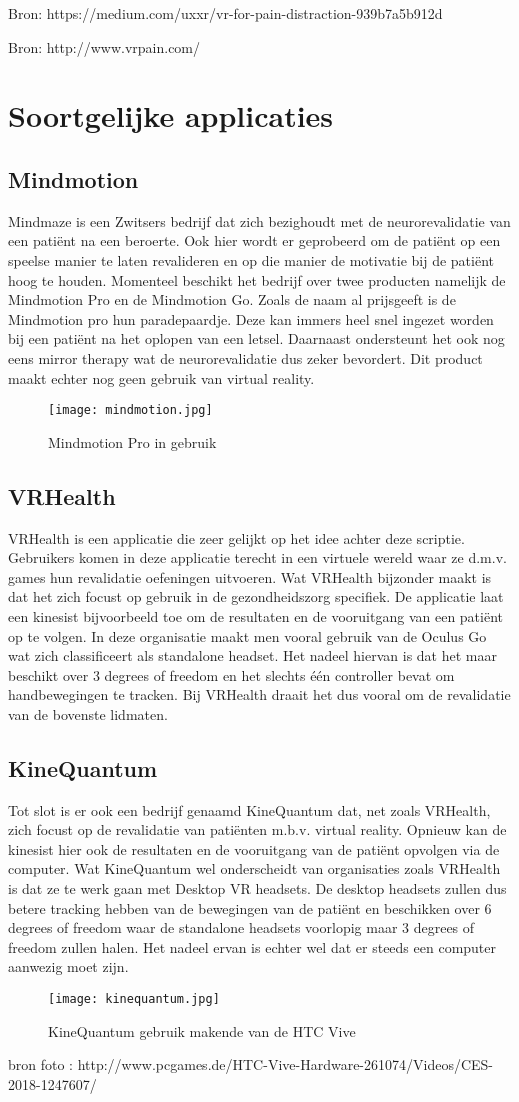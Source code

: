 Bron: https://medium.com/uxxr/vr-for-pain-distraction-939b7a5b912d

Bron: http://www.vrpain.com/


\section{Soortgelijke applicaties}
\subsection{Mindmotion}
Mindmaze is een Zwitsers bedrijf dat zich bezighoudt met de neurorevalidatie van een patiënt na een beroerte. Ook hier wordt er geprobeerd om de patiënt op een speelse manier te laten revalideren en op die manier de motivatie bij de patiënt hoog te houden. Momenteel beschikt het bedrijf over twee producten namelijk de Mindmotion Pro en de Mindmotion Go. Zoals de naam al prijsgeeft is de Mindmotion pro hun paradepaardje. Deze kan immers heel snel ingezet worden bij een patiënt na het oplopen van een letsel. Daarnaast ondersteunt het ook nog eens mirror therapy wat de neurorevalidatie dus zeker bevordert. Dit product maakt echter nog geen gebruik van virtual reality.

\begin{figure}[h]
    \centering
    \texttt{[image: mindmotion.jpg]}
    \caption{Mindmotion Pro in gebruik}
\end{figure}

\subsection{VRHealth}
VRHealth is een applicatie die zeer gelijkt op het idee achter deze scriptie. Gebruikers komen in deze applicatie terecht in een virtuele wereld waar ze d.m.v. games hun revalidatie oefeningen uitvoeren. Wat VRHealth bijzonder maakt is dat het zich focust op gebruik in de gezondheidszorg specifiek. De applicatie laat een kinesist bijvoorbeeld toe om de resultaten en de vooruitgang van een patiënt op te volgen. In deze organisatie maakt men vooral gebruik van de Oculus Go wat zich classificeert als standalone headset. Het nadeel hiervan is dat het maar beschikt over 3 degrees of freedom en het slechts één controller bevat om handbewegingen te tracken. Bij VRHealth draait het dus vooral om de revalidatie van de bovenste lidmaten. 

\subsection{KineQuantum}
Tot slot is er ook een bedrijf genaamd KineQuantum dat, net zoals VRHealth, zich focust op de revalidatie van patiënten m.b.v. virtual reality. Opnieuw kan de kinesist hier ook de resultaten en de vooruitgang van de patiënt opvolgen via de computer. Wat KineQuantum wel onderscheidt van organisaties zoals VRHealth is dat ze te werk gaan met Desktop VR headsets. De desktop headsets zullen dus betere tracking hebben van de bewegingen van de patiënt en beschikken over 6 degrees of freedom waar de standalone headsets voorlopig maar 3 degrees of freedom zullen halen. Het nadeel ervan is echter wel dat er steeds een computer aanwezig moet zijn. 

\begin{figure}[h]
    \centering
    \texttt{[image: kinequantum.jpg]}
    \caption{KineQuantum gebruik makende van de HTC Vive}
\end{figure}
bron foto : http://www.pcgames.de/HTC-Vive-Hardware-261074/Videos/CES-2018-1247607/
